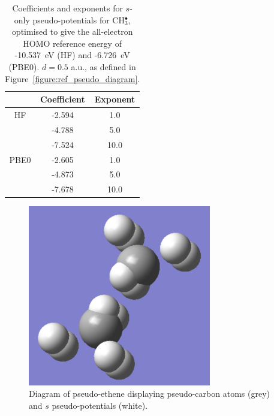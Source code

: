 \documentclass[journal=jctcce,manuscript=article]{achemso}
\begin{document}
\begin{table}[ht]
\caption{Coefficients and exponents for \(s\)-only pseudo-potentials for CH\(^{\bullet}_{3}\), optimised to give 
the all-electron HOMO reference energy of  -10.537~eV (HF) and -6.726~eV (PBE0). 
\(d = 0.5\) a.u., as defined in Figure~\ref{figure:ref_pseudo_diagram}.}
\begin{tabular}{c c c}
\hline
 & Coefficient & Exponent \\ [0.5ex]
\hline
HF & -2.594 & 1.0 \\
 & -4.788 & 5.0 \\
 & -7.524 & 10.0 \\
\hline
PBE0 & -2.605 & 1.0 \\
 & -4.873 & 5.0 \\
 & -7.678 & 10.0 \\
\hline
\end{tabular}
\label{table:ch3_s_potentials}
\end{table}

\begin{figure}
\includegraphics[width=8cm]{long_r_ethene_diagram.png}
\caption{Diagram of pseudo-ethene displaying pseudo-carbon atoms (grey) and \(s\) pseudo-potentials (white).}
\label{fig:long_r_ethene}
\end{figure}
\end{document}
